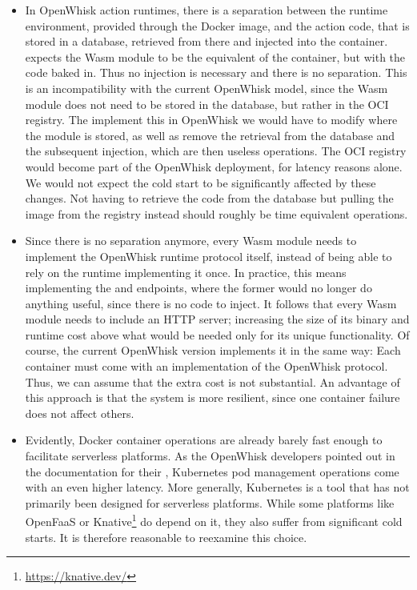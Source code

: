 \begin{itemize}
    \item In OpenWhisk action runtimes, there is a separation between the runtime environment, provided through the Docker image, and the action code, that is stored in a database, retrieved from there and injected into the container.  expects the Wasm module to be the equivalent of the container, but with the code baked in. Thus no injection is necessary and there is no separation. This is an incompatibility with the current OpenWhisk model, since the Wasm module does not need to be stored in the database, but rather in the OCI registry. The implement this in OpenWhisk we would have to modify where the module is stored, as well as remove the retrieval from the database and the subsequent injection, which are then useless operations. The OCI registry would become part of the OpenWhisk deployment, for latency reasons alone. We would not expect the cold start to be significantly affected by these changes. Not having to retrieve the code from the database but pulling the image from the registry instead should roughly be time equivalent operations.
    \item Since there is no separation anymore, every Wasm module needs to implement the OpenWhisk runtime protocol itself, instead of being able to rely on the runtime implementing it once. In practice, this means implementing the  and  endpoints, where the former would no longer do anything useful, since there is no code to inject. It follows that every Wasm module needs to include an HTTP server; increasing the size of its binary and runtime cost above what would be needed only for its unique functionality. Of course, the current OpenWhisk version implements it in the same way: Each container must come with an implementation of the OpenWhisk protocol. Thus, we can assume that the extra cost is not substantial. An advantage of this approach is that the system is more resilient, since one container failure does not affect others.
    \item Evidently, Docker container operations are already barely fast enough to facilitate serverless platforms. As the OpenWhisk developers pointed out in the documentation for their , Kubernetes pod management operations come with an even higher latency. More generally, Kubernetes is a tool that has not primarily been designed for serverless platforms. While some platforms like OpenFaaS or Knative\footnote{\url{https://knative.dev/}}  do depend on it, they also suffer from significant cold starts. It is therefore reasonable to reexamine this choice.

\end{itemize}

